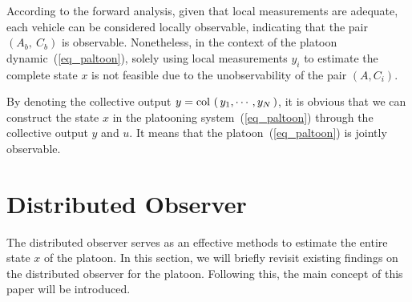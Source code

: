 \documentclass[letterpaper, 10pt, conference]{ieeeconf}  %
\def\col#1{\mathop{{\rm col}\,\left(\,#1\,\right)}}
\def\eqref#1{(\ref{#1})}
\begin{document}
According to the forward analysis, given that local measurements are adequate, each vehicle can be considered locally observable, indicating that the pair $(A_{b},\ C_{b})$ is observable. Nonetheless, in the context of the platoon dynamic~\eqref{eq_paltoon}, solely using local measurements $y_{i}$ to estimate the complete state $x$ is not feasible due to the unobservability of the pair $(A, C_{i})$. 

By denoting the collective output $y = \col{y_{1},\cdots, y_{N}}$, it is obvious that we can construct the state $x$ in the platooning system~\eqref{eq_paltoon} through the collective output $y$ and $u$. It means that the platoon~\eqref{eq_paltoon} is jointly observable. 


\section{Distributed Observer}\label{sec_Distributed Observer}

The distributed observer serves as an effective methods to estimate the entire state $x$ of the platoon. In this section, we will briefly revisit existing findings on the distributed observer for the platoon. Following this, the main concept of this paper will be introduced. 
 
\end{document}
